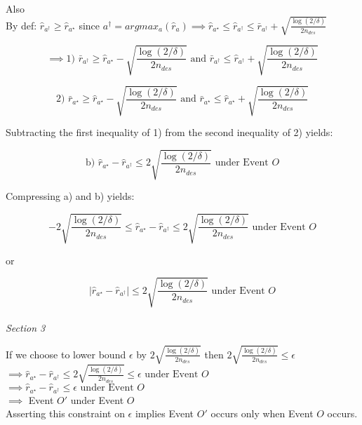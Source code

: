 \documentclass{article}
\begin{document}
Also \\ 

By def: $\hat{r}_{a^{\dagger}} \geq \hat{r}_{a^{\star}}$ since $a^{\dagger} = argmax_{a}(\hat{r}_{a}) \implies \hat{r}_{a^{\star}} \leq \hat{r}_{a^{\dagger}} \leq \bar{r}_{a^{\dagger}} + \sqrt{\frac{\log (2/\delta)}{2n_{des}}}$

$$\implies \text{1) } \bar{r}_{a^{\dagger}} \geq \hat{r}_{a^{\star}} - \sqrt{\frac{\log (2/\delta)}{2n_{des}}} \text{ and } \bar{r}_{a^{\dagger}} \leq \hat{r}_{a^{\dagger}} + \sqrt{\frac{\log (2/\delta)}{2n_{des}}}$$

$$\text{2) } \bar{r}_{a^{\star}} \geq \hat{r}_{a^{\star}} - \sqrt{\frac{\log (2/\delta)}{2n_{des}}} \text{ and } \bar{r}_{a^{\star}} \leq \hat{r}_{a^{\star}} + \sqrt{\frac{\log (2/\delta)}{2n_{des}}}$$ 

Subtracting the first inequality of 1) from the second inequality of 2) yields:

$$\text{b) } \hat{r}_{a^{\star}} - \hat{r}_{a^{\dagger}} \leq 2 \sqrt{\frac{\log (2/\delta)}{2n_{des}}} \text{ under Event $O$}$$

Compressing a) and b) yields:

$$-2 \sqrt{\frac{\log (2/\delta)}{2n_{des}}} \leq \hat{r}_{a^{\star}} - \hat{r}_{a^{\dagger}} \leq 2 \sqrt{\frac{\log (2/\delta)}{2n_{des}}} \text{ under Event $O$}$$
\begin{center}
or
\end{center}
$$\left|\hat{r}_{a^{\star}} - \hat{r}_{a^{\dagger}}\right| \leq 2 \sqrt{\frac{\log (2/\delta)}{2n_{des}}} \text{ under Event $O$}$$ \\

\textit{Section 3}

If we choose to lower bound $\epsilon$ by $2 \sqrt{\frac{\log (2/\delta)}{2n_{des}}}$ then $2 \sqrt{\frac{\log (2/\delta)}{2n_{des}}} \leq \epsilon$ \\

$\implies \hat{r}_{a^{\star}} - \hat{r}_{a^{\dagger}} \leq 2 \sqrt{\frac{\log (2/\delta)}{2n_{des}}} \leq \epsilon \text{ under Event $O$}$ \\

$\implies \hat{r}_{a^{\star}} - \hat{r}_{a^{\dagger}} \leq \epsilon \text{ under Event $O$}$ \\

$\implies$ Event $O'$ under Event $O$ \\

Asserting this constraint on $\epsilon$ implies Event $O'$ occurs only when Event $O$ \indent occurs.\\
\end{document}
